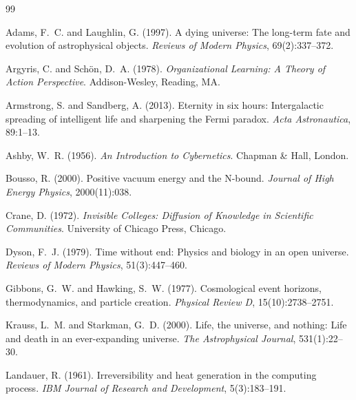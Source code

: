 \documentclass[11pt]{article}
\begin{document}

\begin{thebibliography}{99}

Adams, F.~C. and Laughlin, G. (1997).
\newblock A dying universe: The long-term fate and evolution of astrophysical objects.
\newblock \emph{Reviews of Modern Physics}, 69(2):337--372.

Argyris, C. and Sch\"on, D.~A. (1978).
\newblock \emph{Organizational Learning: A Theory of Action Perspective}.
\newblock Addison-Wesley, Reading, MA.

Armstrong, S. and Sandberg, A. (2013).
\newblock Eternity in six hours: Intergalactic spreading of intelligent life and sharpening the Fermi paradox.
\newblock \emph{Acta Astronautica}, 89:1--13.

Ashby, W.~R. (1956).
\newblock \emph{An Introduction to Cybernetics}.
\newblock Chapman \& Hall, London.

Bousso, R. (2000).
\newblock Positive vacuum energy and the N-bound.
\newblock \emph{Journal of High Energy Physics}, 2000(11):038.

Crane, D. (1972).
\newblock \emph{Invisible Colleges: Diffusion of Knowledge in Scientific Communities}.
\newblock University of Chicago Press, Chicago.

Dyson, F.~J. (1979).
\newblock Time without end: Physics and biology in an open universe.
\newblock \emph{Reviews of Modern Physics}, 51(3):447--460.

Gibbons, G.~W. and Hawking, S.~W. (1977).
\newblock Cosmological event horizons, thermodynamics, and particle creation.
\newblock \emph{Physical Review D}, 15(10):2738--2751.

Krauss, L.~M. and Starkman, G.~D. (2000).
\newblock Life, the universe, and nothing: Life and death in an ever-expanding universe.
\newblock \emph{The Astrophysical Journal}, 531(1):22--30.

Landauer, R. (1961).
\newblock Irreversibility and heat generation in the computing process.
\newblock \emph{IBM Journal of Research and Development}, 5(3):183--191.


\end{thebibliography}
\end{document}
